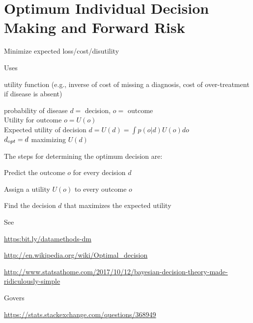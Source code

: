 \section{Optimum Individual Decision Making and Forward Risk}
\bi
\item Minimize expected loss/cost/disutility
\item Uses
 \bi
 \item utility function (e.g., inverse of cost of missing a diagnosis, cost of
 over-treatment if disease is absent)
 \item probability of disease
 \ei
\ei
$d =$ decision, $o =$ outcome\\
Utility for outcome $o = U(o)$\\
Expected utility of decision $d = U(d) = \int p(o | d) U(o)do$\\
$d_{\textrm opt} = d$ maximizing $U(d)$

The steps for determining the optimum decision are:
\be
\item Predict the outcome $o$ for every decision $d$
\item Assign a utility $U(o)$ to every outcome $o$
\item Find the decision $d$ that maximizes the expected utility
\ee

See
\bi
\item \url{https:bit.ly/datamethods-dm}
\item \url{http://en.wikipedia.org/wiki/Optimal_decision}
\item \url{http://www.statsathome.com/2017/10/12/bayesian-decision-theory-made-ridiculously-simple}
\item Govers~\etal~\cite{gov18int}
\item \url{https://stats.stackexchange.com/questions/368949}
\ei



